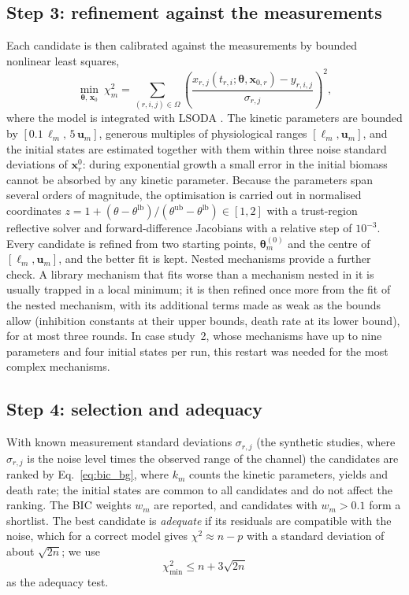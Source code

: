 \subsection{Step 3: refinement against the measurements}\label{sec:m:refine}
Each candidate is then calibrated against the measurements by bounded nonlinear least squares,
\begin{equation}
\min_{\boldsymbol{\theta},\,\mathbf{x}_0}\ \chi^2_m = \sum_{(r,i,j)\in\Omega}\left(\frac{x_{r,j}(t_{r,i};\boldsymbol{\theta},\mathbf{x}_{0,r}) - y_{r,i,j}}{\sigma_{r,j}}\right)^2 ,
\label{eq:chi2}
\end{equation}
where the model is integrated with LSODA \citep{Petzold1983}. The kinetic parameters are bounded by $[0.1\,\boldsymbol{\ell}_m,\,5\,\mathbf{u}_m]$, generous multiples of physiological ranges $[\boldsymbol{\ell}_m,\mathbf{u}_m]$, and the initial states are estimated together with them within three noise standard deviations of $\mathbf{x}^0_r$: during exponential growth a small error in the initial biomass cannot be absorbed by any kinetic parameter. Because the parameters span several orders of magnitude, the optimisation is carried out in normalised coordinates $z = 1+(\theta-\theta^{\mathrm{lb}})/(\theta^{\mathrm{ub}}-\theta^{\mathrm{lb}})\in[1,2]$ with a trust-region reflective solver \citep{Branch1999} and forward-difference Jacobians with a relative step of $10^{-3}$. Every candidate is refined from two starting points, $\boldsymbol{\theta}^{(0)}_m$ and the centre of $[\boldsymbol{\ell}_m,\mathbf{u}_m]$, and the better fit is kept. Nested mechanisms provide a further check. A library mechanism that fits worse than a mechanism nested in it is usually trapped in a local minimum; it is then refined once more from the fit of the nested mechanism, with its additional terms made as weak as the bounds allow (inhibition constants at their upper bounds, death rate at its lower bound), for at most three rounds. In case study~2, whose mechanisms have up to nine parameters and four initial states per run, this restart was needed for the most complex mechanisms.

\subsection{Step 4: selection and adequacy}\label{sec:m:select}
With known measurement standard deviations $\sigma_{r,j}$ (the synthetic studies, where $\sigma_{r,j}$ is the noise level times the observed range of the channel) the candidates are ranked by Eq.~\eqref{eq:bic_bg}, where $k_m$ counts the kinetic parameters, yields and death rate; the initial states are common to all candidates and do not affect the ranking. The BIC weights $w_m$ are reported, and candidates with $w_m>0.1$ form a shortlist. The best candidate is \emph{adequate} if its residuals are compatible with the noise, which for a correct model gives $\chi^2\approx n-p$ with a standard deviation of about $\sqrt{2n}$; we use
\begin{equation}
\chi^2_{\min} \le n + 3\sqrt{2n}
\label{eq:adequacy}
\end{equation}
as the adequacy test.

